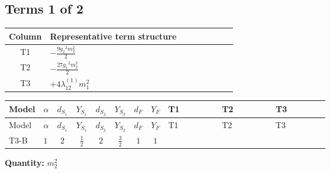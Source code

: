 \documentclass[8pt]{article}
\begin{document}
\begin{landscape}
\subsection*{Terms 1 of 2}
\begin{center}
\begin{tabular}{@{}c >{\raggedright\arraybackslash}p{0.82\linewidth}@{}}
\toprule
Column & Representative term structure \\
\midrule
T1 & \(\displaystyle -\frac{9 {g_2}^2 {m_2^2}}{2}\) \\
\midrule
T2 & \(\displaystyle -\frac{27 {g_1}^2 {m_2^2}}{2}\) \\
\midrule
T3 & \(\displaystyle +4 {\lambda_{12}^{(1)}} {m_1^2}\) \\
\midrule
\bottomrule
\end{tabular}
\end{center}
\smallskip
\tiny
\begin{longtable}{@{}llcccccc >{\raggedright\arraybackslash}p{0.21\linewidth} >{\raggedright\arraybackslash}p{0.21\linewidth} >{\raggedright\arraybackslash}p{0.21\linewidth}@{}}
\toprule
Model & $\alpha$ & $d_{S_1}$ & $Y_{S_1}$ & $d_{S_2}$ & $Y_{S_2}$ & $d_F$ & $Y_F$ & T1 & T2 & T3 \\
\midrule
\endfirsthead
\toprule
Model & $\alpha$ & $d_{S_1}$ & $Y_{S_1}$ & $d_{S_2}$ & $Y_{S_2}$ & $d_F$ & $Y_F$ & T1 & T2 & T3 \\
\midrule
\endhead
T3-B & $1$ & $2$ & $\frac{1}{2}$ & $2$ & $\frac{3}{2}$ & $1$ & $1$ & \scriptsize\adjustbox{max width=\linewidth}{$\begin{gathered} -\frac{9 {g_2}^2 {m_2^2}}{2}\end{gathered}$} & \scriptsize\adjustbox{max width=\linewidth}{$\begin{gathered} -\frac{27 {g_1}^2 {m_2^2}}{2}\end{gathered}$} & \scriptsize\adjustbox{max width=\linewidth}{$\begin{gathered} +4 {\lambda_{12}^{(1)}} {m_1^2}\end{gathered}$} \\
\midrule
\bottomrule
\end{longtable}
\clearpage
\noindent\textbf{Quantity: }$m_2^2$\par\smallskip

\end{landscape}
\end{document}
